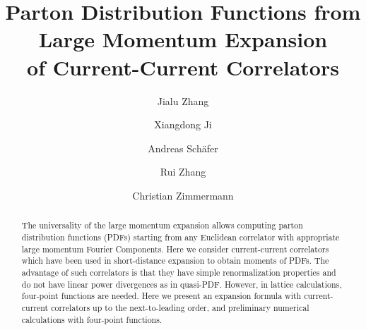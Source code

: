 \documentclass[floatfix,twocolumn,prl,showpacs,preprintnumbers,amsmath,nofootinbib,amssymb,noeprint,superscriptaddress]{revtex4-1}
\begin{document}

\title{Parton Distribution Functions from Large Momentum Expansion \\ of Current-Current Correlators}

\author{Jialu Zhang}
\author{Xiangdong Ji}
\author{Andreas Sch\"afer}
\author{Rui Zhang}
\author{Christian Zimmermann}
\begin{abstract}
The universality of the large momentum expansion allows computing parton distribution functions (PDFs) starting from any Euclidean correlator with appropriate large momentum Fourier Components. Here we consider current-current correlators which have been used 
in short-distance expansion to obtain moments of PDFs. The advantage 
of such correlators is that they have simple renormalization
properties and do not have linear power divergences as in quasi-PDF.
However, in lattice calculations, four-point functions are needed. 
Here we present an expansion formula with current-current correlators
up to the next-to-leading order, and preliminary numerical calculations
with four-point functions.
\end{abstract}
\end{document}
